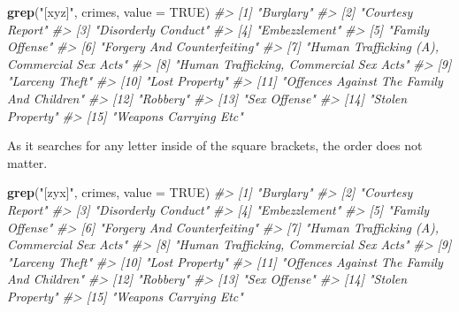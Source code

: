 \documentclass[
  12pt,
]{book}
\newenvironment{Shaded}{\begin{snugshade}}{\end{snugshade}}
\newcommand{\CommentTok}[1]{\textcolor[rgb]{0.56,0.35,0.01}{\textit{#1}}}
\newcommand{\DataTypeTok}[1]{\textcolor[rgb]{0.13,0.29,0.53}{#1}}
\newcommand{\KeywordTok}[1]{\textcolor[rgb]{0.13,0.29,0.53}{\textbf{#1}}}
\newcommand{\NormalTok}[1]{#1}
\newcommand{\OtherTok}[1]{\textcolor[rgb]{0.56,0.35,0.01}{#1}}
\newcommand{\StringTok}[1]{\textcolor[rgb]{0.31,0.60,0.02}{#1}}
\begin{document}
\begin{Shaded}
\begin{Highlighting}[]
\KeywordTok{grep}\NormalTok{(}\StringTok{"[xyz]"}\NormalTok{, crimes, }\DataTypeTok{value =} \OtherTok{TRUE}\NormalTok{)}
\CommentTok{\#>  [1] "Burglary"                                  }
\CommentTok{\#>  [2] "Courtesy Report"                           }
\CommentTok{\#>  [3] "Disorderly Conduct"                        }
\CommentTok{\#>  [4] "Embezzlement"                              }
\CommentTok{\#>  [5] "Family Offense"                            }
\CommentTok{\#>  [6] "Forgery And Counterfeiting"                }
\CommentTok{\#>  [7] "Human Trafficking (A), Commercial Sex Acts"}
\CommentTok{\#>  [8] "Human Trafficking, Commercial Sex Acts"    }
\CommentTok{\#>  [9] "Larceny Theft"                             }
\CommentTok{\#> [10] "Lost Property"                             }
\CommentTok{\#> [11] "Offences Against The Family And Children"  }
\CommentTok{\#> [12] "Robbery"                                   }
\CommentTok{\#> [13] "Sex Offense"                               }
\CommentTok{\#> [14] "Stolen Property"                           }
\CommentTok{\#> [15] "Weapons Carrying Etc"}
\end{Highlighting}
\end{Shaded}

As it searches for any letter inside of the square brackets, the order does not matter.

\begin{Shaded}
\begin{Highlighting}[]
\KeywordTok{grep}\NormalTok{(}\StringTok{"[zyx]"}\NormalTok{, crimes, }\DataTypeTok{value =} \OtherTok{TRUE}\NormalTok{)}
\CommentTok{\#>  [1] "Burglary"                                  }
\CommentTok{\#>  [2] "Courtesy Report"                           }
\CommentTok{\#>  [3] "Disorderly Conduct"                        }
\CommentTok{\#>  [4] "Embezzlement"                              }
\CommentTok{\#>  [5] "Family Offense"                            }
\CommentTok{\#>  [6] "Forgery And Counterfeiting"                }
\CommentTok{\#>  [7] "Human Trafficking (A), Commercial Sex Acts"}
\CommentTok{\#>  [8] "Human Trafficking, Commercial Sex Acts"    }
\CommentTok{\#>  [9] "Larceny Theft"                             }
\CommentTok{\#> [10] "Lost Property"                             }
\CommentTok{\#> [11] "Offences Against The Family And Children"  }
\CommentTok{\#> [12] "Robbery"                                   }
\CommentTok{\#> [13] "Sex Offense"                               }
\CommentTok{\#> [14] "Stolen Property"                           }
\CommentTok{\#> [15] "Weapons Carrying Etc"}
\end{Highlighting}
\end{Shaded}
\end{document}
